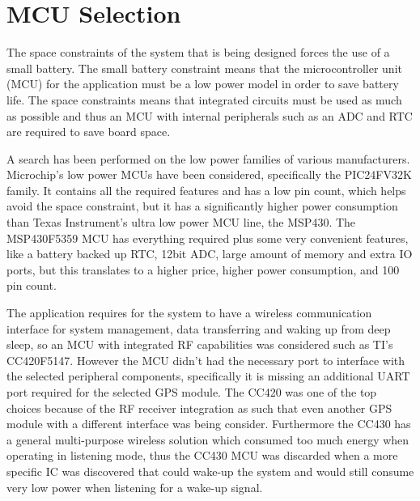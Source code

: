 \section{MCU Selection}
The space constraints of the system that is being designed forces the use of a small battery. The small battery constraint means that the microcontroller unit (MCU) for the application must be a low power model in order to save battery life. The space constraints means that integrated circuits must be used as much as possible and thus an MCU with internal peripherals such as an ADC and RTC are required to save board space. 

A search has been performed on the low power families of various manufacturers. Microchip’s low power MCUs have been considered, specifically the PIC24FV32K family. It contains all the required features and has a low pin count, which helps avoid the space constraint, but it has a significantly higher power consumption than Texas Instrument’s ultra low power MCU line, the MSP430. The MSP430F5359 MCU has everything required plus some very convenient features, like a battery backed up RTC, 12bit ADC, large amount of memory and extra IO ports, but this translates to a higher price, higher power consumption, and 100 pin count. 

The application requires for the system to have a wireless communication interface for system management, data transferring and waking up from deep sleep, so an MCU with integrated RF capabilities was considered such as TI’s CC420F5147. However the MCU didn't had the necessary port to interface with the selected peripheral components, specifically it is missing an additional UART port required for the selected GPS module. The CC420 was one of the top choices because of the RF receiver integration as such that even another GPS module with a different interface was being consider. Furthermore the CC430 has a general multi-purpose wireless solution which consumed too much energy when operating in listening mode, thus the CC430 MCU was discarded when a more specific IC was discovered that could wake-up the system and would still consume very low power when listening for a wake-up signal. 

